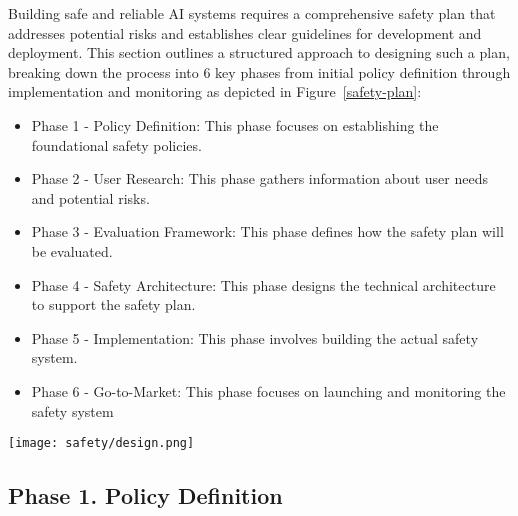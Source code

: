 Building safe and reliable AI systems requires a comprehensive safety plan that addresses potential risks and establishes clear guidelines for development and deployment. This section outlines a structured approach to designing such a plan, breaking down the process into 6 key phases from initial policy definition through implementation and monitoring as depicted in Figure~\ref{safety-plan}:
\begin{itemize}
    \item Phase 1 - Policy Definition: This phase focuses on establishing the foundational safety policies.
    \item Phase 2 - User Research: This phase gathers information about user needs and potential risks.
    \item Phase 3 - Evaluation Framework: This phase defines how the safety plan will be evaluated.
    \item Phase 4 - Safety Architecture: This phase designs the technical architecture to support the safety plan.
    \item Phase 5 - Implementation: This phase involves building the actual safety system.
    \item Phase 6 - Go-to-Market: This phase focuses on launching and monitoring the safety system
\end{itemize}

\begin{figure*}[h!]
\centering
\texttt{[image: safety/design.png]}
\caption{Safety Plan Design Phases.}
\label{safety-plan}
\end{figure*}

\subsection{Phase 1. Policy Definition}

